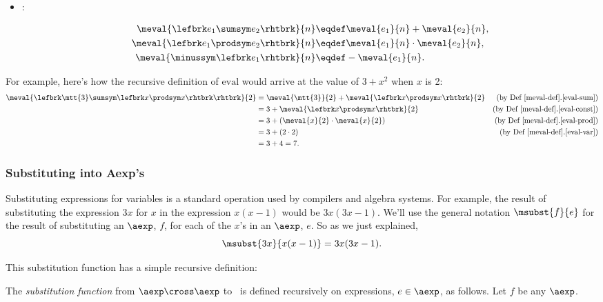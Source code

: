 \begin{definition}
\begin{definition}
\begin{itemize}
\item {}:

\begin{align}
\meval{\lefbrk e_1 \sumsym e_2 \rhtbrk}{n}
   & \eqdef \meval{e_1}{n}+\meval{e_2}{n},\label{eval-sum}\\
\meval{\lefbrk e_1 \prodsym e_2 \rhtbrk}{n}
  & \eqdef \meval{e_1}{n} \cdot \meval{e_2}{n}, \label{eval-prod}\\
\meval{\minussym\lefbrk e_1 \rhtbrk}{n} 
  &  \eqdef - \meval{e_1}{n}. \label{eval-minus}
\end{align}
\end{itemize}

\end{definition}

For example, here's how the recursive definition of $\text{eval}$
would arrive at the value of $3+x^2$ when $x$ is 2:
\begin{align*}
\meval{\lefbrk \mtt{3} \sumsym \lefbrk x \prodsym x\rhtbrk \rhtbrk}{2}
 & = \meval{\mtt{3}}{2} + \meval{\lefbrk x \prodsym x \rhtbrk}{2}
                  & \text{(by~Def~\ref{meval-def}.\ref{eval-sum})}\\
 & = 3 + \meval{\lefbrk x \prodsym x \rhtbrk}{2} & \text{(by~Def~\ref{meval-def}.\ref{eval-const})}\\
 & = 3 + (\meval{x}{2} \cdot \meval{x}{2}) & \text{(by~Def~\ref{meval-def}.\ref{eval-prod})}\\
 & = 3 + (2 \cdot 2) & \text{(by~Def~\ref{meval-def}.\ref{eval-var})}\\
 & = 3 + 4 = 7.
\end{align*}

\subsubsection{Substituting into Aexp's}
Substituting expressions for variables is a standard operation used by
compilers and algebra systems.  For example, the result of substituting
the expression $3x$ for $x$ in the expression $x(x-1)$ would be
$3x(3x-1)$.  We'll use the general notation $\msubst{f}{e}$ for the result
of substituting an $\aexp$, $f$, for each of the $x$'s in an $\aexp$, $e$.
So as we just explained,
\[
\msubst{3x}{x(x-1)} = 3x(3x-1).
\]

This substitution function has a simple recursive definition:

\begin{definition}\label{subst-def}
  The \emph{substitution function} from $\aexp \cross \aexp$ to \aexp\ is
  defined recursively on expressions, $e \in \aexp$, as follows.  Let $f$
  be any $\aexp$.


\end{definition}
\end{definition}
